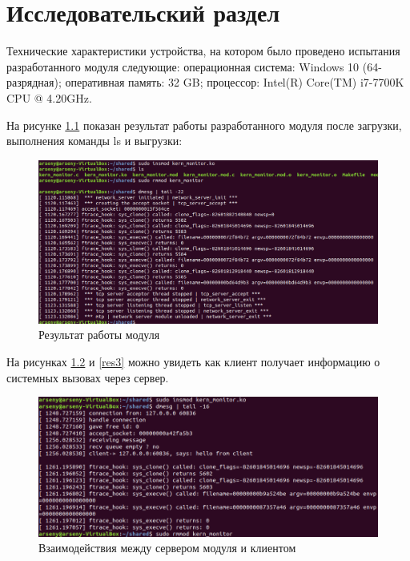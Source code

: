 \chapter{Исследовательский раздел}
Технические характеристики устройства, на котором было проведено испытания разработанного модуля следующие: операционная система: Windows 10 (64-разрядная); оперативная память: 32 GB; процессор: Intel(R) Core(TM) i7-7700K CPU @ 4.20GHz.

На рисунке \ref{res1} показан результат работы разработанного модуля после загрузки, выполнения команды ls и выгрузки:

\begin{figure}[h!]
	\centering
	\includegraphics[width=1.0\textwidth]{img/res1}
	\caption{Результат работы модуля}
	\label{res1}
\end{figure}

\newpage
На рисунках \ref{res2} и \ref{res3} можно увидеть как клиент получает информацию о системных вызовах через сервер.

\begin{figure}[h!]
	\centering
	\includegraphics[width=1.0\textwidth]{img/res2}
	\caption{Взаимодействия между сервером модуля и клиентом}
	\label{res2}
\end{figure}

